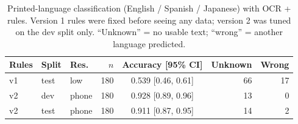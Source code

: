 \begin{table}[htbp]\centering\small
\caption[Printed-language classification]{Printed-language classification (English / Spanish / Japanese) with OCR + rules. Version 1 rules were fixed before seeing any data; version 2 was tuned on the dev split only. ``Unknown'' = no usable text; ``wrong'' = another language predicted.}\label{tab:language-clf}
\begin{tabular}{@{}lllrcrr@{}}
\toprule
Rules & Split & Res. & $n$ & Accuracy [95\% CI] & Unknown & Wrong\\
\midrule
v1 & test & low & 180 & 0.539 {\scriptsize[0.46, 0.61]} & 66 & 17\\
v2 & dev & phone & 180 & 0.928 {\scriptsize[0.89, 0.96]} & 13 & 0\\
v2 & test & phone & 180 & 0.911 {\scriptsize[0.87, 0.95]} & 14 & 2\\
\bottomrule
\end{tabular}
\end{table}
